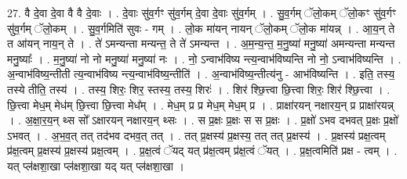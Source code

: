 \documentclass[17pt]{extarticle}
\begin{document}
27. वै दे॒वा दे॒वा वै वै दे॒वाः । . दे॒वाः सु॑व॒र्गꣳ सु॑व॒र्गम् दे॒वा दे॒वाः सु॑व॒र्गम् । . सु॒व॒र्गम् ॅलो॒कम् ॅलो॒कꣳ सु॑व॒र्गꣳ सु॑व॒र्गम् ॅलो॒कम् । . सु॒व॒र्गमिति॑ सुवः - गम् । . लो॒क मा॑यन् नायन् ॅलो॒कम् ॅलो॒क मा॑यन्न् । . आ॒य॒न् ते त आ॑यन् नाय॒न् ते । . ते॑ ऽमन्यन्ता मन्यन्त॒ ते ते॑ ऽमन्यन्त । . अ॒म॒न्य॒न्त॒ म॒नु॒ष्या॑ मनु॒ष्या॑ अमन्यन्ता मन्यन्त मनु॒ष्याः᳚ । . म॒नु॒ष्या॑ नो नो मनु॒ष्या॑ मनु॒ष्या॑ नः । . नो॒ ऽन्वाभ॑विष्य न्त्य॒न्वाभ॑विष्यन्ति नो नो॒ ऽन्वाभ॑विष्यन्ति । . अ॒न्वाभ॑विष्य॒न्तीती त्य॒न्वाभ॑विष्य न्त्य॒न्वाभ॑विष्य॒न्तीति॑ । . अ॒न्वाभ॑विष्य॒न्तीत्य॑नु - आभ॑विष्यन्ति । . इति॒ तस्य॒ तस्ये तीति॒ तस्य॑ । . तस्य॒ शिरः॒ शिर॒ स्तस्य॒ तस्य॒ शिरः॑ । . शिर॑ श्छि॒त्त्वा छि॒त्त्वा शिरः॒ शिर॑ श्छि॒त्त्वा । . छि॒त्त्वा मेध॒म् मेध॑म् छि॒त्त्वा छि॒त्त्वा मेध᳚म् । . मेध॒म् प्र प्र मेध॒म् मेध॒म् प्र । . प्राक्षा॑रयन् नक्षारय॒न् प्र प्राक्षा॑रयन्न् । . अ॒क्षा॒र॒य॒न् थ्स सो᳚ ऽक्षारयन् नक्षारय॒न् थ्सः । . स प्र॒क्षः प्र॒क्षः स स प्र॒क्षः । . प्र॒क्षो॑ ऽभव दभवत् प्र॒क्षः प्र॒क्षो॑ ऽभवत् । . अ॒भ॒व॒त् तत् तद॑भव दभव॒त् तत् । . तत् प्र॒क्षस्य॑ प्र॒क्षस्य॒ तत् तत् प्र॒क्षस्य॑ । . प्र॒क्षस्य॑ प्रक्ष॒त्वम् प्र॑क्ष॒त्वम् प्र॒क्षस्य॑ प्र॒क्षस्य॑ प्रक्ष॒त्वम् । . प्र॒क्ष॒त्वं ॅयद् यत् प्र॑क्ष॒त्वम् प्र॑क्ष॒त्वं ॅयत् । . प्र॒क्ष॒त्वमिति॑ प्रक्ष - त्वम् । . यत् प्ल॑क्षशा॒खा प्ल॑क्षशा॒खा यद् यत् प्ल॑क्षशा॒खा । \newline
\end{document}
